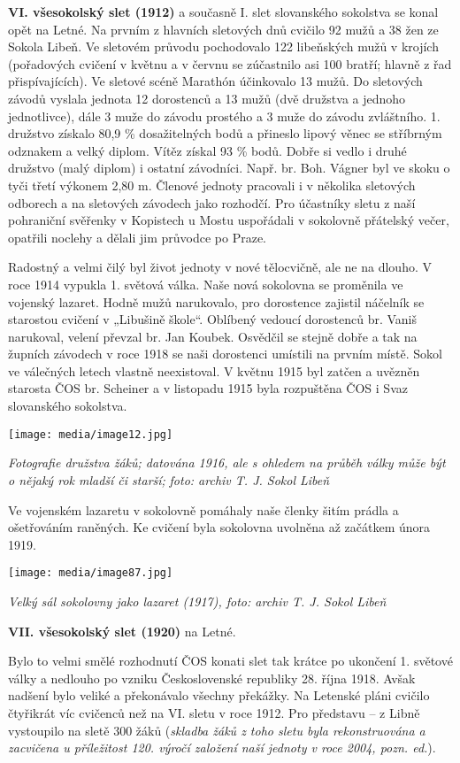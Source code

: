 \textbf{VI. všesokolský slet (1912)} a současně I. slet slovanského
sokolstva se konal opět na Letné. Na prvním z hlavních sletových dnů
cvičilo 92 mužů a 38 žen ze Sokola Libeň. Ve sletovém průvodu
pochodovalo 122 libeňských mužů v krojích (pořadových cvičení v květnu a
v červnu se zúčastnilo asi 100 bratří; hlavně z řad přispívajících). Ve
sletové scéně Marathón účinkovalo 13 mužů. Do sletových závodů vyslala
jednota 12 dorostenců a 13 mužů (dvě družstva a jednoho jednotlivce),
dále 3 muže do závodu prostého a 3 muže do závodu zvláštního. 1.
družstvo získalo 80,9 \% dosažitelných bodů a přineslo lipový věnec se
stříbrným odznakem a velký diplom. Vítěz získal 93 \% bodů. Dobře si
vedlo i druhé družstvo (malý diplom) i ostatní závodníci. Např. br. Boh.
Vágner byl ve skoku o tyči třetí výkonem 2,80 m. Členové jednoty
pracovali i v několika sletových odborech a na sletových závodech jako
rozhodčí. Pro účastníky sletu z naší pohraniční svěřenky v Kopistech u
Mostu uspořádali v sokolovně přátelský večer, opatřili noclehy a dělali
jim průvodce po Praze.

Radostný a velmi čilý byl život jednoty v nové tělocvičně, ale ne na
dlouho. V roce 1914 vypukla 1. světová válka. Naše nová sokolovna se
proměnila ve vojenský lazaret. Hodně mužů narukovalo, pro dorostence
zajistil náčelník se starostou cvičení v „Libušině škole``. Oblíbený
vedoucí dorostenců br. Vaniš narukoval, velení převzal br. Jan Koubek.
Osvědčil se stejně dobře a tak na župních závodech v roce 1918 se naši
dorostenci umístili na prvním místě. Sokol ve válečných letech vlastně
neexistoval. V květnu 1915 byl zatčen a uvězněn starosta ČOS br.
Scheiner a v listopadu 1915 byla rozpuštěna ČOS i Svaz slovanského
sokolstva.

\texttt{[image: media/image12.jpg]}

\emph{Fotografie družstva žáků; datována 1916, ale s ohledem na průběh
války může být o nějaký rok mladší či starší;} \emph{foto: archiv T. J.
Sokol Libeň}

Ve vojenském lazaretu v sokolovně pomáhaly naše členky šitím prádla a
ošetřováním raněných. Ke cvičení byla sokolovna uvolněna až začátkem
února 1919.

\texttt{[image: media/image87.jpg]}

\emph{Velký sál sokolovny jako lazaret (1917), foto: archiv T. J. Sokol
Libeň}

\textbf{VII. všesokolský slet (1920)} na Letné.

Bylo to velmi smělé rozhodnutí ČOS konati slet tak krátce po ukončení 1.
světové války a nedlouho po vzniku Československé republiky 28. října
1918. Avšak nadšení bylo veliké a překonávalo všechny překážky. Na
Letenské pláni cvičilo čtyřikrát víc cvičenců než na VI. sletu v roce
1912. Pro představu -- z Libně vystoupilo na sletě 300 žáků
(\emph{skladba žáků z toho sletu byla rekonstruována a zacvičena u
příležitost 120. výročí založení naší jednoty v roce 2004, pozn. ed.}).

